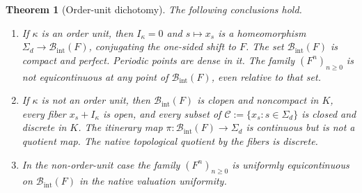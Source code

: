 \documentclass[11pt,a4paper]{article}
\numberwithin{equation}{section}
\newtheorem{theorem}{Theorem}[section]
\theoremstyle{plain}
\theoremstyle{definition}
\theoremstyle{remark}
\newcommand{\Ik}{I_\kappa}
\newcommand{\BI}{\mathcal B_{\mathrm{int}}}
\newcommand{\CS}{\mathcal C}
\newcommand{\Sig}{\Sigma_d}
\begin{document}
\begin{theorem}[Order-unit dichotomy]\label{epd:thm:topology}
The following conclusions hold.
\begin{enumerate}[label=\textup{(\alph*)},leftmargin=2em]
\item If $\kappa$ is an order unit, then $\Ik=0$ and
$s\mapsto x_s$ is a homeomorphism $\Sig\to\BI(F)$, conjugating the
one-sided shift to $F$. The set $\BI(F)$ is compact and perfect.
Periodic points are dense in it. The family $(F^n)_{n\geq0}$ is not
equicontinuous at any point of $\BI(F)$, even relative to that set.
\item If $\kappa$ is not an order unit, then $\BI(F)$ is clopen and noncompact in
$K$, every fiber $x_s+\Ik$ is open, and every subset of
$\CS:=\{x_s:s\in\Sig\}$ is closed and discrete in $K$. The itinerary
map $\pi:\BI(F)\to\Sig$ is continuous but is not a quotient map.
The native topological quotient by the fibers is discrete.
\item In the non-order-unit case the family $(F^n)_{n\geq0}$ is uniformly
equicontinuous on $\BI(F)$ in the native valuation uniformity.
\end{enumerate}
\end{theorem}
\end{document}

